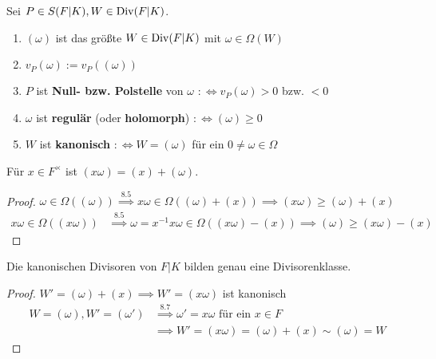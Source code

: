 \begin{definition}
    Sei $P \in S(F|K), W \in \operatorname{Div}(F|K)$.
    \begin{enumerate}[label=(\arabic*)]
        \item $(\omega)$ ist das größte $W \in \operatorname{Div}(F|K)$ mit $\omega \in \Omega(W)$
        \item $v_P(\omega) := v_P((\omega))$
        \item $P$ ist \textbf{Null- bzw. Polstelle} von $\omega$ $: \iff v_P(\omega) > 0$ bzw. $< 0$
        \item $\omega$ ist \textbf{regulär} (oder \textbf{holomorph}) $: \iff (\omega) \geq 0$
        \item $W$ ist \textbf{kanonisch} $:\iff W = (\omega)$ für ein $0 \ne \omega \in \Omega$
    \end{enumerate}
\end{definition}

\begin{lemma}
    Für $x \in F^\times$ ist $(x\omega) = (x) + (\omega)$.
\end{lemma}
\begin{proof}
    $\omega \in \Omega((\omega)) \stackrel{8.5}{\implies} x\omega \in \Omega((\omega)+(x)) \implies (x\omega) \geq (\omega)+(x)$
    \begin{align*}
        x\omega \in \Omega((x\omega)) & \stackrel{8.5}{\implies} \omega = x^{-1}x\omega\in \Omega((x\omega)-(x)) \implies (\omega) \geq (x\omega) - (x)
    \end{align*}
\end{proof}

\begin{satz}
    Die kanonischen Divisoren von $F|K$ bilden genau eine Divisorenklasse.
\end{satz}
\begin{proof}
    $W'=(\omega)+(x) \implies W' = (x\omega)$ ist kanonisch
    \begin{align*}
        W=(\omega),W'=(\omega') & \stackrel{8.7}{\implies} \omega'=x\omega \text{ für ein } x \in F\\
        & \implies W' = (x\omega) = (\omega) + (x) \sim (\omega) = W
    \end{align*}
\end{proof}

